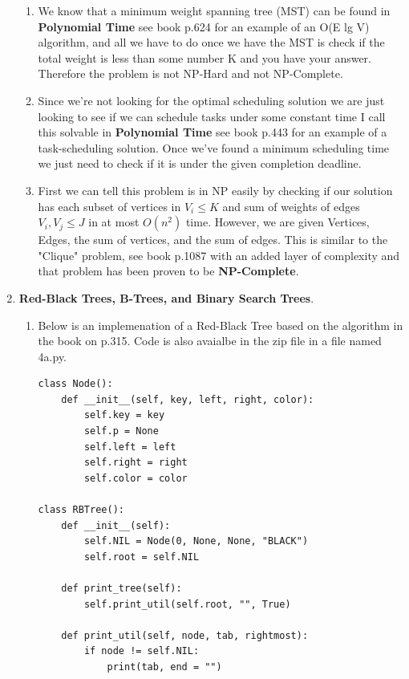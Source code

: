\documentclass{article}
\begin{document}
\begin{enumerate}
\begin{enumerate}
      \item We know that a minimum weight spanning tree (MST) can be found in \textbf{Polynomial Time} see book p.624 for an example of an O(E lg V) algorithm, and all we have to do once we have the MST is check if the total weight is less than some number K and you have your answer. 
      Therefore the problem is not NP-Hard and not NP-Complete. 
    
      \item Since we're not looking for the optimal scheduling solution we are just looking to see if we can schedule tasks under some constant time I call this solvable in \textbf{Polynomial Time} see book p.443 for an example of a task-scheduling solution. 
      Once we've found a minimum scheduling time we just need to check if it is under the given completion deadline. 
    
      \item First we can tell this problem is in NP easily by checking if our solution has each subset of vertices in $V_i \leq K$ and sum of weights of edges $V_i, V_j \leq J$ in at most $O(n^2)$ time. However, we are given Vertices, Edges, the sum of vertices, and the sum of edges.
      This is similar to the "Clique" problem, see book p.1087 with an added layer of complexity and that problem has been proven to be \textbf{NP-Complete}.      
    \end{enumerate}

    \item \textbf{Red-Black Trees, B-Trees, and Binary Search Trees}.
    
    \begin{enumerate}
      \item Below is an implemenation of a Red-Black Tree based on the algorithm in the book on p.315. Code is also avaialbe in the zip file in a file named 4a.py.
      
      \begin{lstlisting}
class Node():
    def __init__(self, key, left, right, color):
        self.key = key
        self.p = None
        self.left = left
        self.right = right
        self.color = color

class RBTree():
    def __init__(self):
        self.NIL = Node(0, None, None, "BLACK")
        self.root = self.NIL
        
    def print_tree(self):
        self.print_util(self.root, "", True)

    def print_util(self, node, tab, rightmost):
        if node != self.NIL:
            print(tab, end = "")            
            

\end{lstlisting}
\end{enumerate}
\end{enumerate}
\end{document}
